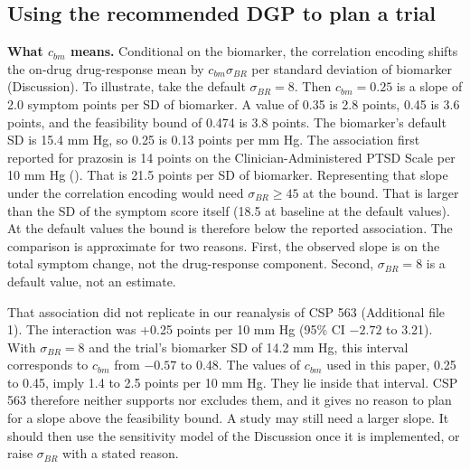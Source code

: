 \documentclass[
  11pt,
]{article}
\begin{document}
\subsection{Using the recommended DGP to plan a trial}\label{using-the-recommended-dgp-to-plan-a-trial}

\textbf{What \(c_{bm}\) means.} Conditional on the biomarker, the correlation
encoding shifts the on-drug drug-response mean by \(c_{bm}\sigma_{BR}\)
per standard deviation of biomarker (Discussion). To illustrate, take
the default \(\sigma_{BR} = 8\). Then \(c_{bm} = 0.25\) is a slope of 2.0
symptom points per SD of biomarker. A value of 0.35 is 2.8 points,
0.45 is 3.6 points, and the feasibility bound of 0.474 is 3.8 points.
The biomarker's default SD is 15.4 mm Hg, so 0.25 is 0.13 points per
mm Hg. The association first reported for prazosin is 14 points on the
Clinician-Administered PTSD Scale per 10 mm Hg (). That
is 21.5 points per SD of biomarker. Representing that slope under the
correlation encoding would need \(\sigma_{BR} \ge 45\) at the bound.
That is larger than the SD of the symptom score itself (18.5 at
baseline at the default values). At the default values the bound is
therefore below the reported association. The comparison is
approximate for two reasons. First, the observed slope is on the total
symptom change, not the drug-response component. Second,
\(\sigma_{BR} = 8\) is a default value, not an estimate.

That association did not replicate in our reanalysis of CSP 563
(Additional file 1). The interaction was +0.25 points per 10 mm Hg
(95\% CI \(-2.72\) to 3.21). With \(\sigma_{BR} = 8\) and the trial's biomarker SD
of 14.2 mm Hg, this interval corresponds to \(c_{bm}\) from \(-0.57\) to
0.48. The values of \(c_{bm}\) used in this paper, 0.25 to 0.45, imply
1.4 to 2.5 points per 10 mm Hg. They lie inside that interval. CSP 563
therefore neither supports nor excludes them, and it gives no reason
to plan for a slope above the feasibility bound. A study may still
need a larger slope. It should then use the sensitivity model of the
Discussion once it is implemented, or raise \(\sigma_{BR}\) with a
stated reason.
\end{document}
